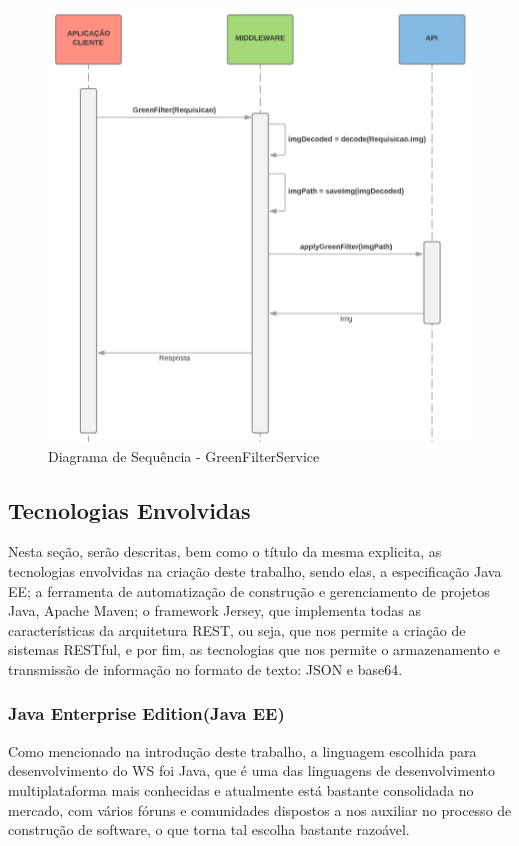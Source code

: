 \documentclass[12pt]{article}
\begin{document}
\begin{figure}[ht]
	\centering
	\includegraphics[width=.7\textwidth]{ds-green-filter.png}
	\caption{Diagrama de Sequência - GreenFilterService}
	\label{fig:Figura3}
\end{figure}

\subsection{Tecnologias Envolvidas}

Nesta seção, serão descritas, bem como o título da mesma explicita, as tecnologias envolvidas na criação deste trabalho, sendo elas, a especificação Java EE; a ferramenta de automatização de construção e gerenciamento de projetos Java, Apache Maven; o framework Jersey, que implementa todas as características da arquitetura REST, ou seja, que nos permite a criação de sistemas RESTful, e por fim, as tecnologias que nos permite o armazenamento e transmissão de informação no formato de texto: JSON e base64.

\subsubsection{Java Enterprise Edition(Java EE)}

Como mencionado na introdução deste trabalho, a linguagem escolhida para desenvolvimento do WS foi Java, que é uma das linguagens de desenvolvimento multiplataforma mais conhecidas e atualmente está bastante consolidada no mercado, com vários fóruns e comunidades dispostos a nos auxiliar no processo de construção de software, o que torna tal escolha bastante razoável. 
\end{document}
